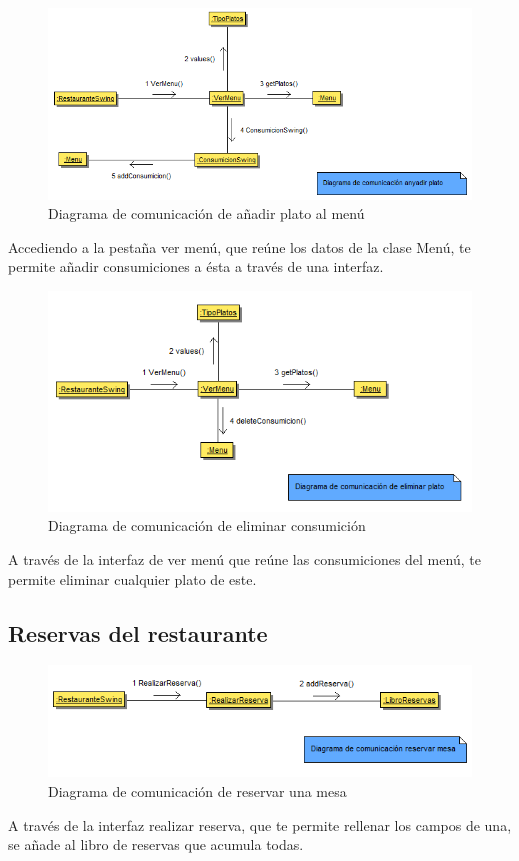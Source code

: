 \documentclass[spanish,a4paper,11pt, twoside]{report}	%
\begin{document}
		\begin{figure}[!h]
		\centering
		\includegraphics[scale=0.5]{DCanyadirconsumicion.png}
		\caption{Diagrama de comunicación de añadir plato al menú}
		\end{figure}
		Accediendo a la pestaña ver menú, que reúne los datos de la clase Menú, te
		permite añadir consumiciones a ésta a través de una interfaz.

		\begin{figure}[!h]
		\centering
		\includegraphics[scale=0.5]{DCeliminarconsumicion.png}
		\caption{Diagrama de comunicación de eliminar consumición}
		\end{figure}
		A través de la interfaz de ver menú que reúne las consumiciones del menú, te permite
		eliminar cualquier plato de este.

		\subsection{Reservas del restaurante}

		\begin{figure}[!h]
		\centering
		\includegraphics[scale=0.5]{DCreserva.png}
		\caption{Diagrama de comunicación de reservar una mesa}
		\end{figure}
		A través de la interfaz realizar reserva, que te permite rellenar los campos de 
		una, se añade al libro de reservas que acumula todas.
\end{document}
